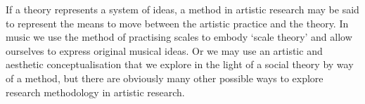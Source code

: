 \documentclass[12pt]{article}
\begin{document}


If a theory represents a system of ideas, a method in artistic research may be said to represent the means to move between the artistic practice and the theory. In music we use the method of practising scales to embody `scale theory' and allow ourselves to express original musical ideas. Or we may use an artistic and aesthetic conceptualisation that we explore in the light of a social theory by way of a method, but there are obviously many other possible ways to explore research methodology in artistic research.
\end{document}
